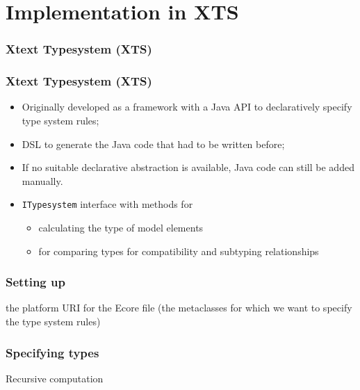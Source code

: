 \section[XTS]{Implementation in XTS}

\begin{frame}
  \frametitle{Xtext Typesystem (XTS)}
  \tableofcontents[currentsection]
\end{frame}

\begin{frame}
  \frametitle{Xtext Typesystem (XTS)}
  \begin{itemize}
  \item Originally developed as a framework with a Java API to declaratively
	specify type system rules; 
   \item DSL to generate the Java code that had to be written before;
   \item If no suitable declarative abstraction is available, 
   Java code can still be added manually.
   \item \texttt{ITypesystem} interface with methods for
   \begin{itemize}
	\item calculating the type of model elements
	\item for comparing types for
	compatibility and subtyping relationships
   \end{itemize}
\end{itemize}
\end{frame}

\begin{frame}[fragile]
  \frametitle{Setting up}


  \begin{footnotesize}
    
  \end{footnotesize}


the platform URI for the Ecore file (the metaclasses for
which we want to specify the type system rules)

\end{frame}

\begin{frame}[fragile]
  \frametitle{Specifying types}

  \begin{footnotesize}
    
  \end{footnotesize}


  \begin{footnotesize}
    
  \end{footnotesize}


\medskip

	Recursive computation

  \begin{footnotesize}
    
  \end{footnotesize}


\end{frame}

